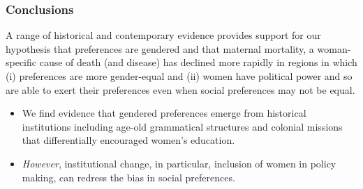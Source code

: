 \documentclass[9pt,letterpaper,subeqn]{beamer}
\begin{document}
\begin{frame}
\frametitle{Conclusions}
A range of historical and contemporary evidence provides support for our hypothesis that preferences are gendered and that maternal mortality, a woman-specific cause of death (and disease) has declined more rapidly in regions in which (i) preferences are more gender-equal and (ii) women have political power and so are able to exert their preferences even when social preferences may not be equal.
\vspace{3mm}
\begin{itemize}
  \setlength{\itemsep}{10pt}
\item We find evidence that gendered preferences emerge from historical institutions including age-old grammatical structures and colonial missions that differentially encouraged women's education.
\item \emph{However}, institutional change, in particular, inclusion of women in policy making, can redress the bias in social preferences.
\end{itemize}
\end{frame}
\end{document}
